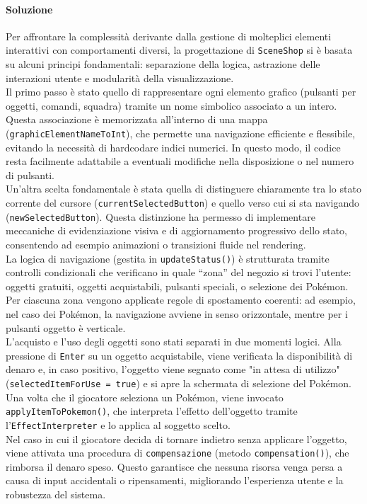 \documentclass[a4paper,12pt]{report}
\begin{document}
{{\paragraph{Soluzione}  
Per affrontare la complessità derivante dalla gestione di molteplici elementi interattivi con comportamenti diversi, la progettazione di \texttt{SceneShop} si è basata su alcuni principi fondamentali: separazione della logica, astrazione delle interazioni utente e modularità della visualizzazione.\\
Il primo passo è stato quello di rappresentare ogni elemento grafico (pulsanti per oggetti, comandi, squadra) tramite un nome simbolico associato a un intero. Questa associazione è memorizzata all’interno di una mappa (\texttt{graphicElementNameToInt}), che permette una navigazione efficiente e flessibile, evitando la necessità di hardcodare indici numerici. In questo modo, il codice resta facilmente adattabile a eventuali modifiche nella disposizione o nel numero di pulsanti.\\
Un’altra scelta fondamentale è stata quella di distinguere chiaramente tra lo stato corrente del cursore (\texttt{currentSelectedButton}) e quello verso cui si sta navigando (\texttt{newSelectedButton}). Questa distinzione ha permesso di implementare meccaniche di evidenziazione visiva e di aggiornamento progressivo dello stato, consentendo ad esempio animazioni o transizioni fluide nel rendering.\\
La logica di navigazione (gestita in \texttt{updateStatus()}) è strutturata tramite controlli condizionali che verificano in quale “zona” del negozio si trovi l’utente: oggetti gratuiti, oggetti acquistabili, pulsanti speciali, o selezione dei Pokémon. Per ciascuna zona vengono applicate regole di spostamento coerenti: ad esempio, nel caso dei Pokémon, la navigazione avviene in senso orizzontale, mentre per i pulsanti oggetto è verticale.\\
L'acquisto e l'uso degli oggetti sono stati separati in due momenti logici. Alla pressione di \texttt{Enter} su un oggetto acquistabile, viene verificata la disponibilità di denaro e, in caso positivo, l'oggetto viene segnato come "in attesa di utilizzo" (\texttt{selectedItemForUse = true}) e si apre la schermata di selezione del Pokémon. Una volta che il giocatore seleziona un Pokémon, viene invocato \texttt{applyItemToPokemon()}, che interpreta l’effetto dell’oggetto tramite l’\texttt{EffectInterpreter} e lo applica al soggetto scelto.\\
Nel caso in cui il giocatore decida di tornare indietro senza applicare l’oggetto, viene attivata una procedura di \texttt{compensazione} (metodo \texttt{compensation()}), che rimborsa il denaro speso. Questo garantisce che nessuna risorsa venga persa a causa di input accidentali o ripensamenti, migliorando l’esperienza utente e la robustezza del sistema.\\
}}
\end{document}
